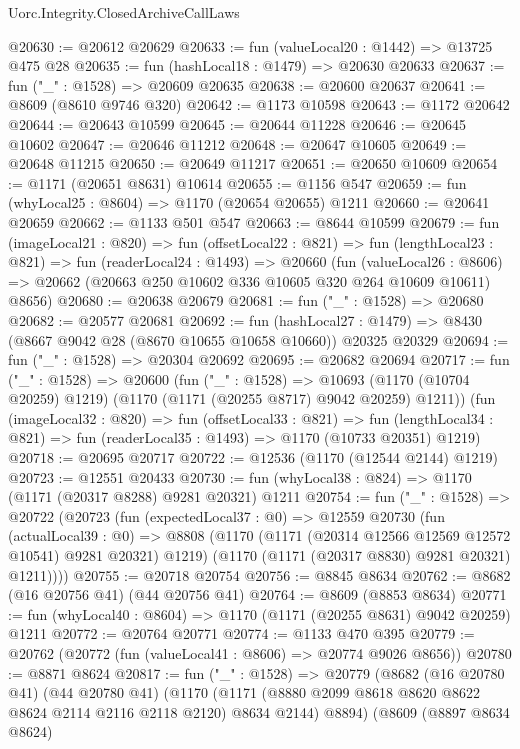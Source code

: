 \begin{lexlean}{Uorc.Integrity.ClosedArchiveCallLaws}
\begin{coremodule}
@20630 := @20612 @20629
@20633 := fun (valueLocal20 : @1442) => @13725 @475 @28
@20635 := fun (hashLocal18 : @1479) => @20630 @20633
@20637 := fun ("_" : @1528) => @20609 @20635
@20638 := @20600 @20637
@20641 := @8609 (@8610 @9746 @320)
@20642 := @1173 @10598
@20643 := @1172 @20642
@20644 := @20643 @10599
@20645 := @20644 @11228
@20646 := @20645 @10602
@20647 := @20646 @11212
@20648 := @20647 @10605
@20649 := @20648 @11215
@20650 := @20649 @11217
@20651 := @20650 @10609
@20654 := @1171 (@20651 @8631) @10614
@20655 := @1156 @547
@20659 := fun (whyLocal25 : @8604) => @1170 (@20654 @20655) @1211
@20660 := @20641 @20659
@20662 := @1133 @501 @547
@20663 := @8644 @10599
@20679 := fun (imageLocal21 : @820) =>
  fun (offsetLocal22 : @821) =>
  fun (lengthLocal23 : @821) =>
  fun (readerLocal24 : @1493) =>
  @20660
    (fun (valueLocal26 : @8606) =>
    @20662 (@20663 @250 @10602 @336 @10605 @320 @264 @10609 @10611) @8656)
@20680 := @20638 @20679
@20681 := fun ("_" : @1528) => @20680
@20682 := @20577 @20681
@20692 := fun (hashLocal27 : @1479) =>
  @8430 (@8667 @9042 @28 (@8670 @10655 @10658 @10660)) @20325 @20329
@20694 := fun ("_" : @1528) => @20304 @20692
@20695 := @20682 @20694
@20717 := fun ("_" : @1528) =>
  @20600
    (fun ("_" : @1528) =>
    @10693 (@1170 (@10704 @20259) @1219) (@1170 (@1171 (@20255 @8717) @9042 @20259) @1211))
    (fun (imageLocal32 : @820) =>
    fun (offsetLocal33 : @821) =>
    fun (lengthLocal34 : @821) => fun (readerLocal35 : @1493) => @1170 (@10733 @20351) @1219)
@20718 := @20695 @20717
@20722 := @12536 (@1170 (@12544 @2144) @1219)
@20723 := @12551 @20433
@20730 := fun (whyLocal38 : @824) => @1170 (@1171 (@20317 @8288) @9281 @20321) @1211
@20754 := fun ("_" : @1528) =>
  @20722
    (@20723
      (fun (expectedLocal37 : @0) =>
      @12559
        @20730
        (fun (actualLocal39 : @0) =>
        @8808
          (@1170 (@1171 (@20314 @12566 @12569 @12572 @10541) @9281 @20321) @1219)
          (@1170 (@1171 (@20317 @8830) @9281 @20321) @1211))))
@20755 := @20718 @20754
@20756 := @8845 @8634
@20762 := @8682 (@16 @20756 @41) (@44 @20756 @41)
@20764 := @8609 (@8853 @8634)
@20771 := fun (whyLocal40 : @8604) => @1170 (@1171 (@20255 @8631) @9042 @20259) @1211
@20772 := @20764 @20771
@20774 := @1133 @470 @395
@20779 := @20762 (@20772 (fun (valueLocal41 : @8606) => @20774 @9026 @8656))
@20780 := @8871 @8624
@20817 := fun ("_" : @1528) =>
  @20779
    (@8682
      (@16 @20780 @41)
      (@44 @20780 @41)
      (@1170
        (@1171 (@8880 @2099 @8618 @8620 @8622 @8624 @2114 @2116 @2118 @2120) @8634 @2144)
        @8894)
      (@8609
        (@8897 @8634 @8624)

\end{coremodule}
\end{lexlean}
